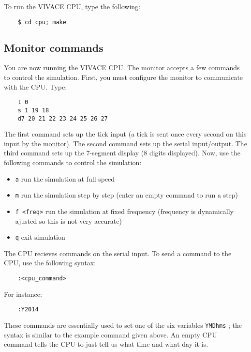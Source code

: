 \documentclass[11pt, a4paper]{article}
\newcommand{\prog}[1]{{\tt#1}}
\begin{document}
To run the VIVACE CPU, type the following:

\begin{verbatim}
    $ cd cpu; make
\end{verbatim}

\subsection{Monitor commands}

You are now running the VIVACE CPU. The monitor accepts a few commands to control the simulation.
First, you must configure the monitor to communicate with the CPU. Type:

\begin{verbatim}
    t 0
    s 1 19 18
    d7 20 21 22 23 24 25 26 27
\end{verbatim}

The first command sets up the tick input (a tick is sent once every second on this input by the monitor). The
second command sets up the serial input/output. The third command sets up the 7-segment display (8 digits displayed).
Now, use the following commands to control the simulation:

\begin{itemize}
    \item \prog{a} run the simulation at full speed
    \item \prog{m} run the simulation step by step (enter an empty command to run a step)
    \item \prog{f <freq>} run the simulation at fixed frequency (frequency is dynamically ajusted so
            this is not very accurate)
    \item \prog{q} exit simulation
\end{itemize}

The CPU recieves commands on the serial input. To send a command to the CPU, use the following syntax:

\begin{verbatim}
    :<cpu_command>
\end{verbatim}

For instance:

\begin{verbatim}
    :Y2014
\end{verbatim}

These commands are essentially used to set one of the six variables \prog{YMDhms} ; the syntax is similar to the
example command given above. An empty CPU command tells the CPU to just tell us what time and what day it is.
\end{document}
